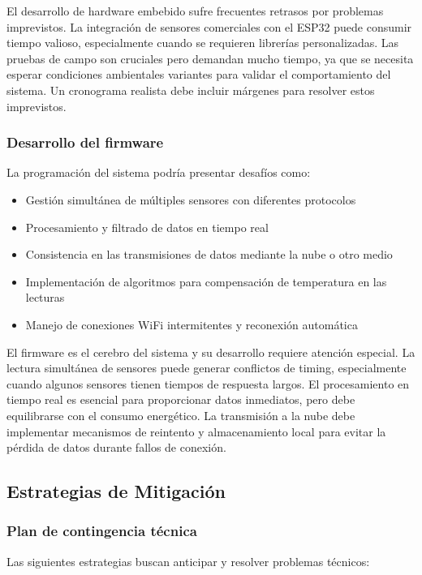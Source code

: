 \documentclass{article}
\begin{document}
El desarrollo de hardware embebido sufre frecuentes retrasos por problemas imprevistos. La integración de sensores comerciales con el ESP32 puede consumir tiempo valioso, especialmente cuando se requieren librerías personalizadas. Las pruebas de campo son cruciales pero demandan mucho tiempo, ya que se necesita esperar condiciones ambientales variantes para validar el comportamiento del sistema. Un cronograma realista debe incluir márgenes para resolver estos imprevistos.

\subsubsection{Desarrollo del firmware}
La programación del sistema podría presentar desafíos como:

\begin{itemize}
    \item Gestión simultánea de múltiples sensores con diferentes protocolos
    \item Procesamiento y filtrado de datos en tiempo real
    \item Consistencia en las transmisiones de datos mediante la nube o otro medio
    \item Implementación de algoritmos para compensación de temperatura en las lecturas
    \item Manejo de conexiones WiFi intermitentes y reconexión automática
\end{itemize}

El firmware es el cerebro del sistema y su desarrollo requiere atención especial. La lectura simultánea de sensores puede generar conflictos de timing, especialmente cuando algunos sensores tienen tiempos de respuesta largos. El procesamiento en tiempo real es esencial para proporcionar datos inmediatos, pero debe equilibrarse con el consumo energético. La transmisión a la nube debe implementar mecanismos de reintento y almacenamiento local para evitar la pérdida de datos durante fallos de conexión.

\subsection{Estrategias de Mitigación}

\subsubsection{Plan de contingencia técnica}
Las siguientes estrategias buscan anticipar y resolver problemas técnicos:
\end{document}
